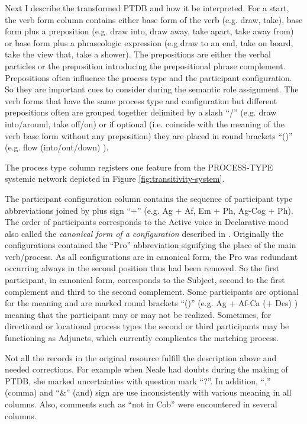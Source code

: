 Next I describe the transformed PTDB and how it be interpreted. For a start, the verb form column contains either base form of the verb (e.g. draw, take), base form plus a preposition (e.g. draw into, draw away, take apart, take away from) or base form plus a phraseologic expression (e.g draw to an end, take on board, take the view that, take a shower). The prepositions are either the verbal particles or the preposition introducing the prepositional phrase complement. Prepositions often influence the process type and the participant configuration. So they are important cues to consider during the semantic role assignment. The verb forms that have the same process type and configuration but different prepositions often are grouped together delimited by a slash ``/'' (e.g. draw into/around, take off/on) or if optional (i.e. coincide with the meaning of the verb base form without any preposition) they are placed in round brackets ``()'' (e.g. flow (into/out/down) ).

The process type column registers one feature from the PROCESS-TYPE systemic network depicted in Figure \ref{fig:transitivity-system}. 

The participant configuration column contains the sequence of participant type abbreviations joined by plus sign ``+'' (e.g. Ag + Af, Em + Ph, Ag-Cog + Ph). The order of participants corresponds to the Active voice in Declarative mood also called the \textit{canonical form of a configuration} described in \citet{Fawcett2009}. Originally the configurations contained the ``Pro'' abbreviation signifying the place of the main verb/process. As all configurations are in canonical form, the Pro was redundant occurring always in the second position thus had been removed. So the first participant, in canonical form, corresponds to the Subject, second to the first complement and third to the second complement. Some participants are optional for the meaning and are marked round brackets ``()'' (e.g. Ag + Af-Ca (+ Des) ) meaning that the participant may or may not be realized. Sometimes, for directional or locational process types the second or third participants may be functioning as Adjuncts, which currently complicates the matching process.

Not all the records in the original resource fulfill the description above and needed corrections. For example when Neale had doubts during the making of PTDB, she marked uncertainties with question mark ``?''. In addition, ``,'' (comma) and ``\&'' (and) sign are use inconsistently with various meaning in all columns. Also, comments such as ``not in Cob'' were encountered in several columns. 

